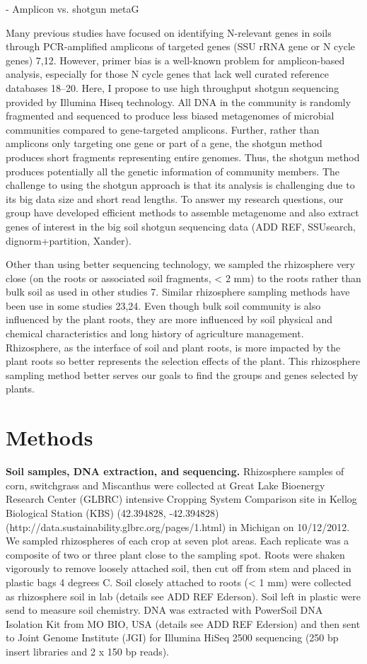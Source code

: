\documentclass[12pt]{article}
\begin{document}
- Amplicon vs. shotgun metaG

Many previous studies have focused on identifying N-relevant genes in soils through PCR-amplified amplicons of targeted genes (SSU rRNA gene or N cycle genes) 7,12. However, primer bias is a well-known problem for amplicon-based analysis, especially for those N cycle genes that lack well curated reference databases 18–20. Here, I propose to use high throughput shotgun sequencing provided by Illumina Hiseq technology. All DNA in the community is randomly fragmented and sequenced to produce less biased metagenomes of microbial communities compared to gene-targeted amplicons. Further, rather than amplicons only targeting one gene or part of a gene, the shotgun method produces short fragments representing entire genomes. Thus, the shotgun method produces potentially all the genetic information of community members. The challenge to using the shotgun approach is that its analysis is challenging due to its big data size and short read lengths. To answer my research questions, our group have developed efficient methods to assemble metagenome and also extract genes of interest in the big soil shotgun sequencing data (ADD REF, SSUsearch, dignorm+partition, Xander).

Other than using better sequencing technology, we sampled the rhizosphere very close (on the roots or associated soil fragments, {\textless} 2 mm) to the roots rather than bulk soil as used in other studies 7. Similar rhizosphere sampling methods have been use in some studies 23,24. Even though bulk soil community is also influenced by the plant roots, they are more influenced by soil physical and chemical characteristics and long history of agriculture management. Rhizosphere, as the interface of soil and plant roots, is more impacted by the plant roots so better represents the selection effects of the plant. This rhizosphere sampling method better serves our goals to find the groups and genes selected by plants.

\section{Methods}

{\bf Soil samples, DNA extraction, and sequencing.}
Rhizosphere samples of corn, switchgrass and Miscanthus were collected at Great Lake Bioenergy Research Center (GLBRC) intensive Cropping System Comparison site in Kellog Biological Station (KBS) (42.394828, -42.394828) (http://data.sustainability.glbrc.org/pages/1.html) in Michigan on 10/12/2012. We sampled rhizospheres of each crop at seven plot areas. Each replicate was a composite of two or three plant close to the sampling spot. Roots were shaken vigorously to remove loosely attached soil, then cut off from stem and placed in plastic bags 4 degrees C. Soil closely attached to roots ({\textless} 1 mm) were collected as rhizosphere soil in lab (details see ADD REF Ederson). Soil left in plastic were send to measure soil chemistry. DNA was extracted with PowerSoil DNA Isolation Kit from MO BIO, USA (details see ADD REF Edersion) and then sent to Joint Genome Institute (JGI) for Illumina HiSeq 2500 sequencing (250 bp insert libraries and 2 x 150 bp reads).
\end{document}

